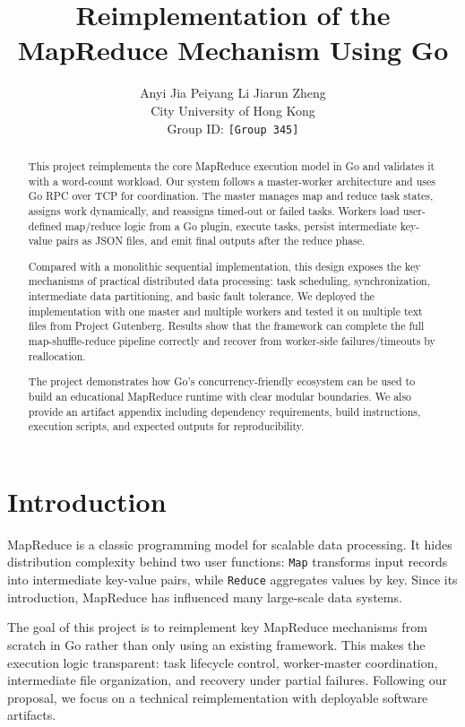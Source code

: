 \documentclass[12pt]{article}
\title{Reimplementation of the MapReduce Mechanism Using Go}
\author{
Anyi Jia \quad Peiyang Li \quad Jiarun Zheng\\
City University of Hong Kong\\
Group ID: \texttt{[Group 345]}
}
\begin{document}
\maketitle

\begin{abstract}
This project reimplements the core MapReduce execution model in Go and validates it with a word-count workload. Our system follows a master-worker architecture and uses Go RPC over TCP for coordination. The master manages map and reduce task states, assigns work dynamically, and reassigns timed-out or failed tasks. Workers load user-defined map/reduce logic from a Go plugin, execute tasks, persist intermediate key-value pairs as JSON files, and emit final outputs after the reduce phase.

Compared with a monolithic sequential implementation, this design exposes the key mechanisms of practical distributed data processing: task scheduling, synchronization, intermediate data partitioning, and basic fault tolerance. We deployed the implementation with one master and multiple workers and tested it on multiple text files from Project Gutenberg. Results show that the framework can complete the full map-shuffle-reduce pipeline correctly and recover from worker-side failures/timeouts by reallocation.

The project demonstrates how Go's concurrency-friendly ecosystem can be used to build an educational MapReduce runtime with clear modular boundaries. We also provide an artifact appendix including dependency requirements, build instructions, execution scripts, and expected outputs for reproducibility.
\end{abstract}

\section{Introduction}
MapReduce is a classic programming model for scalable data processing. It hides distribution complexity behind two user functions: \texttt{Map} transforms input records into intermediate key-value pairs, while \texttt{Reduce} aggregates values by key. Since its introduction, MapReduce has influenced many large-scale data systems.

The goal of this project is to reimplement key MapReduce mechanisms from scratch in Go rather than only using an existing framework. This makes the execution logic transparent: task lifecycle control, worker-master coordination, intermediate file organization, and recovery under partial failures. Following our proposal, we focus on a technical reimplementation with deployable software artifacts.
\end{document}
